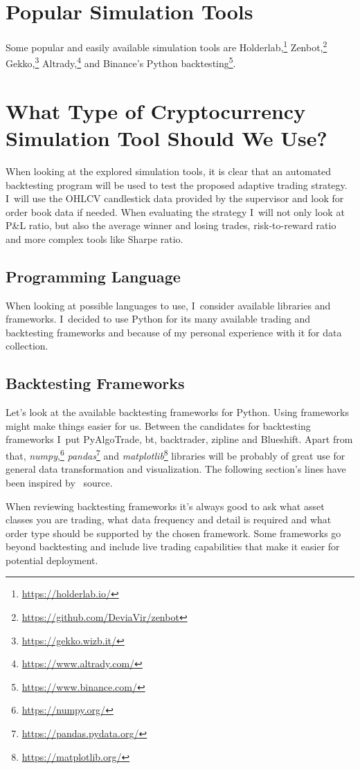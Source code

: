 \section{Popular Simulation Tools}
Some popular and easily available simulation tools are Holderlab,\footnote{\url{https://holderlab.io/}} Zenbot,\footnote{\url{https://github.com/DeviaVir/zenbot}} Gekko,\footnote{\url{https://gekko.wizb.it/}} Altrady,\footnote{\url{https://www.altrady.com/}} and Binance's Python backtesting\footnote{\url{https://www.binance.com/}}.

\section{What Type of Cryptocurrency Simulation Tool Should We Use?}
When looking at the explored simulation tools, it is clear that an automated backtesting program will be used to test the proposed adaptive trading strategy. I~will use the OHLCV candlestick data provided by the supervisor and look for order book data if needed. When evaluating the strategy I~will not only look at P\&L ratio, but also the average winner and losing trades, risk-to-reward ratio and more complex tools like Sharpe ratio.

\subsection*{Programming Language}
When looking at possible languages to use, I~consider available libraries and frameworks. I~decided to use Python for its many available trading and backtesting frameworks and because of my personal experience with it for data collection.

\subsection*{Backtesting Frameworks}
Let's look at the available backtesting frameworks for Python. Using frameworks might make things easier for us. Between the candidates for backtesting frameworks I~put PyAlgoTrade, bt, backtrader, zipline and Blueshift. Apart from that, \emph{numpy},\footnote{\url{https://numpy.org/}} \emph{pandas}\footnote{\url{https://pandas.pydata.org/}} and \emph{matplotlib}\footnote{\url{https://matplotlib.org/}} libraries will be probably of great use for general data transformation and visualization. The following section's lines have been inspired by~\cite{python-backtesting-frameworks} source.

When reviewing backtesting frameworks it's always good to ask what asset classes you are trading, what data frequency and detail is required and what order type should be supported by the chosen framework. Some frameworks go beyond backtesting and include live trading capabilities that make it easier for potential deployment.

